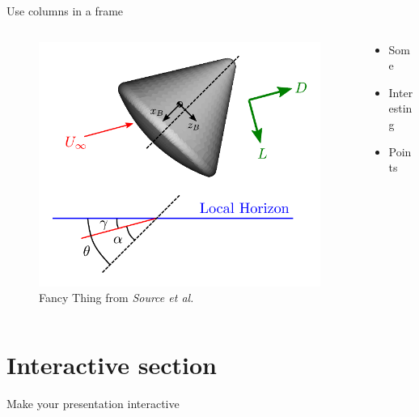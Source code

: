\documentclass{cubeamer}
\begin{document}
\begin{frame}{Use columns in a frame}
    \begin{columns}
        \begin{column}{0.6\textwidth}
            \begin{figure}
                \centering
                \includegraphics[height = 0.7\textheight]{figures/example.pdf}
                \caption{Fancy Thing from \textit{Source et al.}}
            \end{figure}
        \end{column}
        \begin{column}{0.4\textwidth}
            \begin{itemize}
                \item Some
                \item Interesting
                \item Points
            \end{itemize}
        \end{column}
    \end{columns}
\end{frame}

\section{Interactive section}

\begin{frame}{Make your presentation interactive}
    \begin{cublock}
        \begin{overlayarea}{\textwidth}{\baselineskip}
        \end{overlayarea}
    \end{cublock}
\end{frame}
\end{document}
